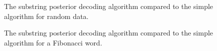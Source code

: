 \begin{figure}
  \centering
  
  \caption{The substring posterior decoding algorithm compared to the simple
    algorithm for random data.}
  \label{fig:indexed_posterior_speedup_vs_subseq}
\end{figure}

\begin{figure}
  \centering
  
  \caption{The substring posterior decoding algorithm compared to the simple
    algorithm for a Fibonacci word.}
  \label{fig:fib_indexed_posterior_speedup_vs_subseq}
\end{figure}

